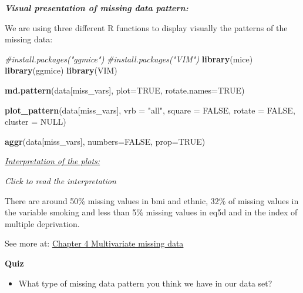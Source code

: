 \documentclass[
]{article}
\newenvironment{Shaded}{\begin{snugshade}}{\end{snugshade}}
\newcommand{\AttributeTok}[1]{\textcolor[rgb]{0.13,0.29,0.53}{#1}}
\newcommand{\CommentTok}[1]{\textcolor[rgb]{0.56,0.35,0.01}{\textit{#1}}}
\newcommand{\ConstantTok}[1]{\textcolor[rgb]{0.56,0.35,0.01}{#1}}
\newcommand{\FunctionTok}[1]{\textcolor[rgb]{0.13,0.29,0.53}{\textbf{#1}}}
\newcommand{\NormalTok}[1]{#1}
\newcommand{\StringTok}[1]{\textcolor[rgb]{0.31,0.60,0.02}{#1}}
\providecommand{\tightlist}{%
  \setlength{\itemsep}{0pt}\setlength{\parskip}{0pt}}
\begin{document}
\textbf{\emph{Visual presentation of missing data pattern:}}

We are using three different R functions to display visually the
patterns of the missing data:

\begin{Shaded}
\begin{Highlighting}[]
\CommentTok{\#install.packages("ggmice")}
\CommentTok{\#install.packages("VIM")}
\FunctionTok{library}\NormalTok{(mice)}
\FunctionTok{library}\NormalTok{(ggmice)}
\FunctionTok{library}\NormalTok{(VIM)}

\FunctionTok{md.pattern}\NormalTok{(data[miss\_vars], }\AttributeTok{plot=}\ConstantTok{TRUE}\NormalTok{, }\AttributeTok{rotate.names=}\ConstantTok{TRUE}\NormalTok{)}
\end{Highlighting}
\end{Shaded}

\begin{Shaded}
\begin{Highlighting}[]
\FunctionTok{plot\_pattern}\NormalTok{(data[miss\_vars], }\AttributeTok{vrb =} \StringTok{"all"}\NormalTok{, }\AttributeTok{square =} \ConstantTok{FALSE}\NormalTok{, }\AttributeTok{rotate =} \ConstantTok{FALSE}\NormalTok{, }\AttributeTok{cluster =} \ConstantTok{NULL}\NormalTok{)}
\end{Highlighting}
\end{Shaded}

\begin{Shaded}
\begin{Highlighting}[]
\FunctionTok{aggr}\NormalTok{(data[miss\_vars], }\AttributeTok{numbers=}\ConstantTok{FALSE}\NormalTok{, }\AttributeTok{prop=}\ConstantTok{TRUE}\NormalTok{)}
\end{Highlighting}
\end{Shaded}

\ul{\emph{Interpretation of the plots:}}

\emph{Click to read the interpretation}

There are around 50\% missing values in bmi and ethnic, 32\% of missing
values in the variable smoking and less than 5\% missing values in eq5d
and in the index of multiple deprivation.

See more at:
\href{https://stefvanbuuren.name/fimd/ch-multivariate.html}{Chapter 4
Multivariate missing data}

\textbf{Quiz}

\begin{itemize}
\tightlist
\item
  What type of missing data pattern you think we have in our data set?
\end{itemize}
\end{document}
